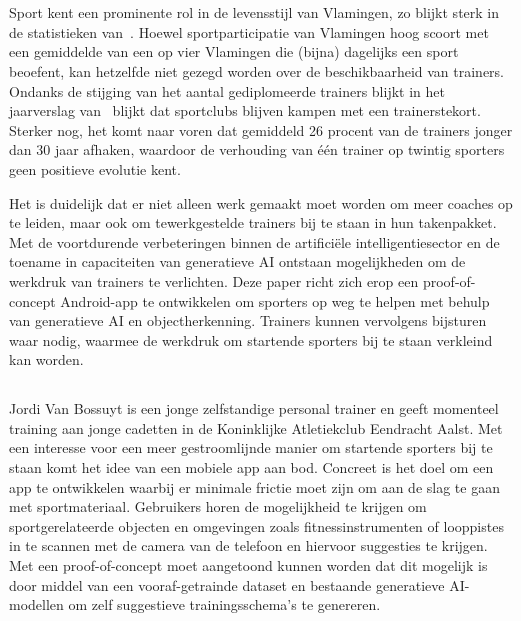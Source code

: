 

\chapter{}
\label{ch:inleiding}
Sport kent een prominente rol in de levensstijl van Vlamingen, zo blijkt sterk in de statistieken van~\textcite{StatistiekVlaanderen2023}.
Hoewel sportparticipatie van Vlamingen hoog scoort met een gemiddelde van een op vier Vlamingen die (bijna) dagelijks een sport beoefent, kan hetzelfde niet gezegd worden over de beschikbaarheid van trainers.
Ondanks de stijging van het aantal gediplomeerde trainers blijkt in het jaarverslag van~\textcite{SportVlaanderen2023} blijkt dat sportclubs blijven kampen met een trainerstekort.
Sterker nog, het komt naar voren dat gemiddeld 26 procent van de trainers jonger dan 30 jaar afhaken, waardoor de verhouding van \'e\'en trainer op twintig sporters geen positieve evolutie kent.

Het is duidelijk dat er niet alleen werk gemaakt moet worden om meer coaches op te leiden, maar ook om tewerkgestelde trainers bij te staan in hun takenpakket.
Met de voortdurende verbeteringen binnen de artifici\"ele intelligentiesector en de toename in capaciteiten van generatieve AI ontstaan mogelijkheden om de werkdruk van trainers te verlichten.
Deze paper richt zich erop een proof-of-concept Android-app te ontwikkelen om sporters op weg te helpen met behulp van generatieve AI en objectherkenning.
Trainers kunnen vervolgens bijsturen waar nodig, waarmee de werkdruk om startende sporters bij te staan verkleind kan worden.

\section{}
\label{sec:probleemstelling}
Jordi Van Bossuyt is een jonge zelfstandige personal trainer en geeft momenteel training aan jonge cadetten in de Koninklijke Atletiekclub Eendracht Aalst.
Met een interesse voor een meer gestroomlijnde manier om startende sporters bij te staan komt het idee van een mobiele app aan bod.
Concreet is het doel om een app te ontwikkelen waarbij er minimale frictie moet zijn om aan de slag te gaan met sportmateriaal.
Gebruikers horen de mogelijkheid te krijgen om sportgerelateerde objecten en omgevingen zoals fitnessinstrumenten of looppistes in te scannen met de camera van de telefoon en hiervoor suggesties te krijgen.
Met een proof-of-concept moet aangetoond kunnen worden dat dit mogelijk is door middel van een vooraf-getrainde dataset en bestaande generatieve AI-modellen om zelf suggestieve trainingsschema's te genereren.

